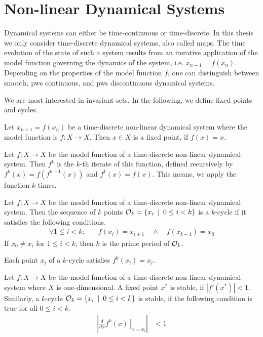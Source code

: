 \section{Non-linear Dynamical Systems}

Dynamical systems can either be time-continuous or time-discrete.
In this thesis we only consider time-discrete dynamical systems, also called maps.
The time evolution of the state of such a system results from an iterative application of the model function governing the dynamics of the system, i.e. $x_{n+1} = f(x_n)$.
Depending on the properties of the model function $f$, one can distinguish between smooth, \gls{pws} continuous, and \gls{pws} discontinuous dynamical systems.

We are most interested in invariant sets.
In the following, we define fixed points and cycles.

\begin{definition}
	Let $x_{n+1} = f(x_n)$ be a time-discrete non-linear dynamical system where the model function is $f: X \to X$.
	Then $x \in X$ is a fixed point, if $f(x) = x$.
\end{definition}

\begin{definition}
	Let $f: X \to X$ be the model function of a time-discrete non-linear dynamical system.
	Then $f^k$ is the $k$-th iterate of this function, defined recursively by $f^k(x) = f\left(f^{k-1}(x)\right)$ and $f^1(x) = f(x)$.
	This means, we apply the function $k$ times.
\end{definition}

\begin{definition}[Cycle]
	Let $f: X \to X$ be the model function of a time-discrete non-linear dynamical system.
	Then the sequence of $k$ points $\mathcal{O}_k = \{x_i \:\mid\: 0 \leq i < k\}$ is a $k$-cycle if it satisfies the following conditions.
	\begin{align}
		\forall 1 \leq i < k: \quad & f(x_i) = x_{i+1} \quad \land \quad f(x_{k-1}) = x_0
	\end{align}
	If $x_0 \neq x_i$ for $1 \leq i < k$, then $k$ is the prime period of $\mathcal{O}_k$.
\end{definition}

Each point $x_i$ of a $k$-cycle satisfies $f^k(x_i) = x_i$.

\begin{definition}[Stability]
	Let $f: X \to X$ be the model function of a time-discrete non-linear dynamical system where $X$ is one-dimensional.
	A fixed point $x^*$ is stable, if $|f'(x^*)| < 1$.
	Similarly, a $k$-cycle $\mathcal{O}_k = \{x_i \:\mid\: 0 \leq i < k\}$ is stable, if the following condition is true for all $0 \leq i < k$.
	\begin{align}
		\left| \left. \frac{d}{dx}f^k(x) \:\right|_{x = x_i}\right| & < 1
	\end{align}
\end{definition}

